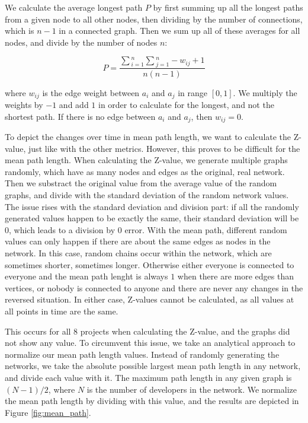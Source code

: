 We calculate the average longest path $P$ by first summing up all the longest paths from a given node to all other nodes, then dividing by the number of connections, which is $n-1$ in a connected graph. Then we sum up all of these averages for all nodes, and divide by the number of nodes $n$:

\[ P = \frac{\sum{_{i=1}^{n}} \sum{_{j=1}^{n} -w_{ij}+1} }{n(n-1)} \]

where $w_{ij}$ is the edge weight between $a_i$ and $a_j$ in range $[0, 1]$. We multiply the weights by $-1$ and add $1$ in order to calculate for the longest, and not the shortest path. If there is no edge between $a_i$ and $a_j$, then $w_{ij}=0$.

To depict the changes over time in mean path length, we want to calculate the Z-value, just like with the other metrics. However, this proves to be difficult for the mean path length. When calculating the Z-value, we generate multiple graphs randomly, which have as many nodes and edges as the original, real network. Then we substract the original value from the average value of the random graphs, and divide with the standard deviation of the random network values. The issue rises with the standard deviation and division part: if all the randomly generated values happen to be exactly the same, their standard deviation will be $0$, which leads to a division by $0$ error. With the mean path, different random values can only happen if there are about the same edges as nodes in the network. In this case, random chains occur within the network, which are sometimes shorter, sometimes longer. Otherwise either everyone is connected to everyone and the mean path lenght is always $1$ when there are more edges than vertices, or nobody is connected to anyone and there are never any changes in the reversed situation. In either case, Z-values cannot be calculated, as all values at all points in time are the same.

This occurs for all 8 projects when calculating the Z-value, and the graphs did not show any value. To circumvent this issue, we take an analytical approach to normalize our mean path length values. Instead of randomly generating the networks, we take the absolute possible largest mean path length in any network, and divide each value with it. The maximum path length in any given graph is $(N-1)/2$, where $N$ is the number of developers in the network. We normalize the mean path length by dividing with this value, and the results are depicted in Figure \ref{fig:mean_path}.

